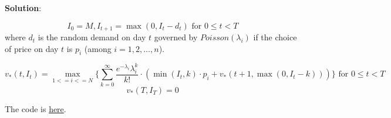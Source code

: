 \documentclass[12pt]{exam}
\begin{document}
\begin{questions}
{\bf Solution}:
 
 $$I_0 = M, I_{t+1} = \max(0, I_t - d_t) \mbox{ for } 0 \leq t < T$$
 where $d_t$ is the random demand on day $t$ governed by $Poisson(\lambda_i)$ if the choice of price on day $t$ is $p_i$ (among $i = 1, 2, \ldots, n$).
 
 
 $$v_*(t, I_t) = \max_{1 <= i <= N} \{ \sum_{k=0}^{\infty} \frac {e^{-\lambda_i} \lambda_i^k} {k!} \cdot (\min(I_t, k) \cdot p_i + v_*(t+1, \max(0, I_t - k))) \}\mbox{ for } 0 \leq t < T$$
 $$v_*(T, I_T) = 0$$
 
The code is \href{https://github.com/coverdrive/MDP-DP-RL/blob/master/src/examples/price_control.py}{here}.

\end{questions}
\end{document}
